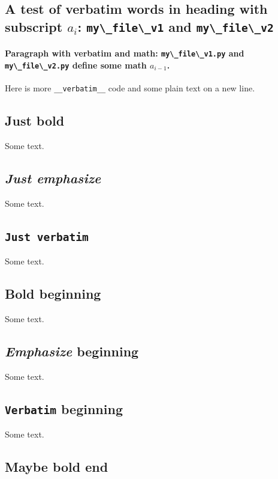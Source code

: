 \n\documentclass[%
oneside,                 %
final,                   %
10pt]{article}
\theoremstyle{definition}
\begin{document}
\begin{enumerate}
\noindent
\subsection{A test of verbatim words in heading with subscript $a_i$: \protect\Verb!my\_file\_v1! and \protect\Verb!my\_file\_v2! }

\paragraph{Paragraph with verbatim and math: \protect\Verb!my\_file\_v1.py! and \protect\Verb!my\_file\_v2.py! define some math $a_{i-1}$.}
Here is more \Verb!__verbatim__! code and
some plain text on a new line.

\subsection{\textbf{Just bold}}

Some text.

\subsection{\emph{Just emphasize}}

Some text.

\subsection{\texttt{Just verbatim} }

Some text.

\subsection{\textbf{Bold} beginning}

Some text.

\subsection{\emph{Emphasize} beginning}

Some text.

\subsection{\texttt{Verbatim} beginning}

Some text.

\subsection{Maybe \textbf{bold end}}


\end{enumerate}
\end{document}

